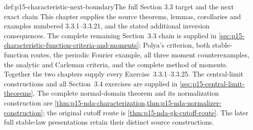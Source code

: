 \begin{proofboundary}{def:p15-characteristic-next-boundary}{The full Section 3.3 target and the next exact chain}
This chapter supplies the source theorems, lemmas, corollaries
and examples numbered 3.3.1--3.3.21, and the stated additional
inversion consequences. The complete remaining Section~3.3 chain is
supplied in \cref{sec:p15-characteristic-function-criteria-and-moments}:
Polya's criterion, both stable-function routes, the periodic Fourier
example, all three moment counterexamples, the analytic and Carleman
criteria, and the complete method of moments. Together the two
chapters supply every Exercise~3.3.1--3.3.25.
The central-limit constructions and all Section~3.4 exercises are
supplied in \cref{sec:p15-central-limit-theorems}. The complete
normal-domain theorem and its normalization construction are
\cref{thm:p15-nda-characterization,thm:p15-nda-normalizer-construction};
the original cutoff route is \cref{thm:p15-nda-gk-cutoff-route}.
The later full stable-law presentations retain their distinct source
constructions.
\end{proofboundary}
